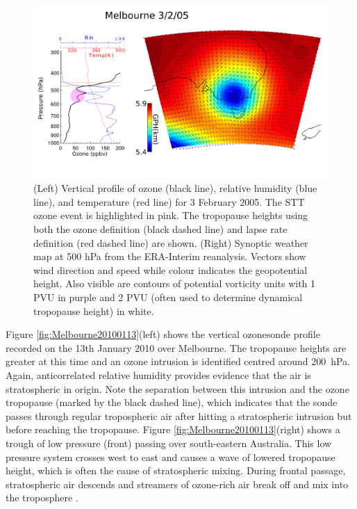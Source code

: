 \documentclass{article}
\begin{document}
  \begin{figure}[!htbp]
    \begin{center}
    \includegraphics[width=1.0\columnwidth]{figures/Melbourne20050203.png}
    \caption{(Left) Vertical profile of ozone (black line), relative humidity (blue line), and temperature (red line) for  3 February 2005.
    The STT ozone event is highlighted in pink.
    The tropopause heights using both the ozone definition (black dashed line) and lapse rate definition (red dashed line) are shown.
    (Right) Synoptic weather map at 500 hPa from the ERA-Interim reanalysis.
    Vectors show wind direction and speed while colour indicates the geopotential height.
    Also visible are contours of potential vorticity units with 1 PVU in purple and 2 PVU (often used to determine dynamical tropopause height) in white.}
    \label{fig:Melbourne20050203}
    \end{center}
  \end{figure}
  
  Figure \ref{fig:Melbourne20100113}(left) shows the vertical ozonesonde profile recorded on the 13th January 2010 over Melbourne.
  The tropopause heights are greater at this time and an ozone intrusion is identified centred around 200~hPa.
  Again, anticorrelated relative humidity provides evidence that the air is stratospheric in origin.
  Note the separation between this intrusion and the ozone tropopause (marked by the black dashed line), which indicates that the sonde passes through regular tropospheric air after hitting a stratospheric intrusion but before reaching the tropopause.
  Figure \ref{fig:Melbourne20100113}(right) shows a trough of low pressure (front) passing over south-eastern Australia.
  This low pressure system crosses west to east and causes a wave of lowered tropopause height, which is often the cause of stratospheric mixing.
  During frontal passage, stratospheric air descends and streamers of ozone-rich air break off and mix into the troposphere \citep{Sprenger2003}.
  
\end{document}
